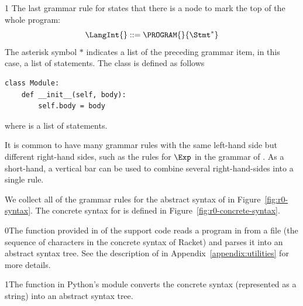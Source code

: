 \documentclass[7x10,nocrop]{TimesAPriori_MIT}%
\def\racketEd{0}
\def\pythonEd{1}
\def\edition{1}
\newcommand{\racket}[1]{{\if\edition\racketEd{#1}\fi}}
\newcommand{\python}[1]{{\if\edition\pythonEd #1\fi}}
\begin{document}
{\if\edition\pythonEd
The last grammar rule for \LangInt{} states that there is a
 node to mark the top of the whole program:
\[
  \LangInt{} ::= \PROGRAM{}{\Stmt^{*}}
\]
The asterisk symbol $*$ indicates a list of the preceding grammar item, in
this case, a list of statements.
%
The  class is defined as follows
\begin{lstlisting}
class Module:
    def __init__(self, body):
        self.body = body
\end{lstlisting}
where  is a list of statements.
\fi}

It is common to have many grammar rules with the same left-hand side
but different right-hand sides, such as the rules for $\Exp$ in the
grammar of \LangInt{}. As a short-hand, a vertical bar can be used to
combine several right-hand-sides into a single rule.

We collect all of the grammar rules for the abstract syntax of \LangInt{}
in Figure~\ref{fig:r0-syntax}. The concrete syntax for \LangInt{} is
defined in Figure~\ref{fig:r0-concrete-syntax}.

\racket{The  function provided in
  \code{utilities.rkt} of the support code reads a program in from a
  file (the sequence of characters in the concrete syntax of Racket)
  and parses it into an abstract syntax tree. See the description of
  \code{read-program} in Appendix~\ref{appendix:utilities} for more
  details.}

\python{The  function in Python's  module
  converts the concrete syntax (represented as a string) into an
  abstract syntax tree.}

\newcommand{\LintGrammarRacket}{
  \begin{array}{rcl}
    \Type &::=& \key{Integer} \\
    \Exp{} &::=& \Int{} \MID \CREAD \RP \MID \CNEG{\Exp} \MID \CADD{\Exp}{\Exp}
  \end{array}
}
\newcommand{\LintASTRacket}{
  \begin{array}{rcl}
    \Type &::=& \key{Integer} \\
    \Exp{} &::=& \INT{\Int} \MID \READ{} \\
           &\MID& \NEG{\Exp} \MID \ADD{\Exp}{\Exp}
  \end{array}
}
\newcommand{\LintGrammarPython}{
\begin{array}{rcl}
  \Exp &::=& \Int \MID \key{input\_int}\LP\RP \MID \key{-}\;\Exp \MID \Exp \; \key{+} \; \Exp \MID \Exp \; \key{-} \; \Exp \MID \LP\Exp\RP \\
  \Stmt &::=& \key{print}\LP \Exp \RP \MID \Exp
\end{array}
}
\newcommand{\LintASTPython}{
  \begin{array}{rcl}
  \itm{binaryop} &::= & \code{Add()} \MID \code{Sub()} \\
  \itm{unaryop} &::= & \code{USub()} \\
  \Exp{} &::=& \INT{\Int} \MID \READ{} \\
        &\MID& \UNIOP{\itm{unaryop}}{\Exp} \MID  \BINOP{\itm{binaryop}}{\Exp}{\Exp}  \\
  \Stmt{} &::=& \PRINT{\Exp} \MID \EXPR{\Exp} 
\end{array}
}
\end{document}
